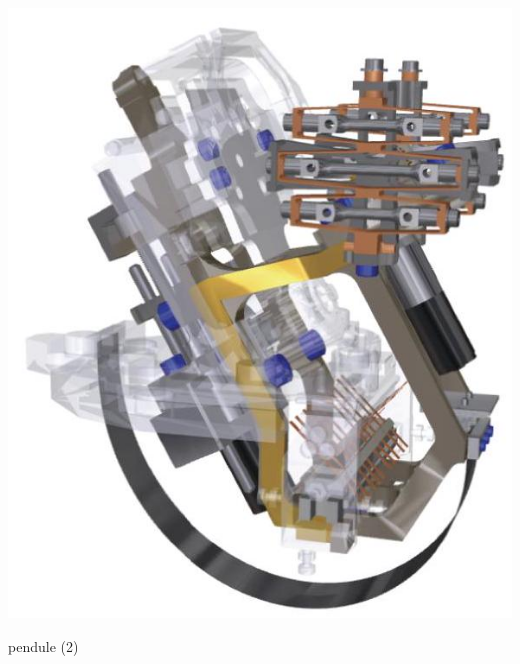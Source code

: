 \documentclass[10pt]{article}
\begin{document}
\begin{center}
\includegraphics[max width=\textwidth]{2024_04_26_3285cfc264024262add0g-15}
\end{center}

pendule (2)
\end{document}
